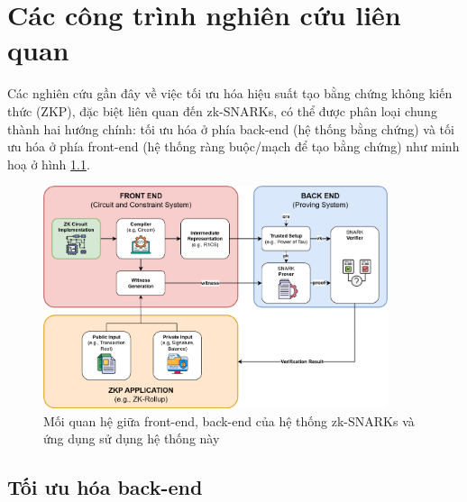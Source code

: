 \chapter{Các công trình nghiên cứu liên quan}
\label{chap:chap2}

Các nghiên cứu gần đây về việc tối ưu hóa hiệu suất tạo bằng chứng không kiến thức (ZKP), đặc biệt liên quan đến zk-SNARKs, có thể được phân loại chung thành hai hướng chính: tối ưu hóa ở phía back-end (hệ thống bằng chứng) và tối ưu hóa ở phía front-end (hệ thống ràng buộc/mạch để tạo bằng chứng) \cite{ernstberger2024zk} như minh hoạ ở hình \ref{fig:chapter2-SNARKs_realworld}.


\begin{figure}[H]
    \centering
    \includegraphics[width = 0.9\textwidth]{imgs/SNARKsFlow.png}
    \caption{Mối quan hệ giữa front-end, back-end của hệ thống zk-SNARKs và ứng dụng sử dụng hệ thống này}
    \label{fig:chapter2-SNARKs_realworld}
\end{figure}

\section{Tối ưu hóa back-end}

